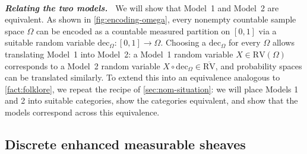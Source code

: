 \documentclass[
  sigconf,
  screen, ]{acmart}
\theoremstyle{definition}
\newcommand\goodparagraph[1]{\hspace{0em}\\[-0.5em]\textbf{\textit{#1.~}}}
\newcommand\nref[2]{\hyperref[#1]{#2}} \newcommand\checkhigh{{\huge{\color{red}\textbf{TODO: check}}}}
\newcommand\sheafcatadj{enhanced measurable}
\newcommand\Dgoodsheaves{Discrete \sheafcatadj{} sheaves}
\newcommand\dec{\mathrm{dec}}
\newcommand\nomDRVprelim{{\nref{def:nomDRVprelim}{\overline{\mathrm{RV}}}}}
\newcommand\DRV{{\nref{prop:dwarp-in-the-atomic-sheaves}{\mathrm{RV}}}}
\begin{document}
\goodparagraph{Relating the two models}
We will show that Model~1 and Model~2 are equivalent.
As shown in \ref{fig:encoding-omega},
every nonempty countable sample space $\Omega$ can be encoded as a
countable measured partition on $[0,1]$ via a suitable
random variable $\dec_\Omega : [0,1]\to\Omega$.
Choosing a $\dec_\Omega$
for every $\Omega$
allows translating Model~1 into Model~2:
a Model~1 random variable $X \in \DRV(\Omega)$
corresponds to a Model~2 random variable $X\circ\dec_\Omega\in\nomDRVprelim$,
and probability spaces can be translated similarly.
To extend this into an equivalence analogous to \cref{fact:folklore},
we repeat the recipe of \cref{sec:nom-situation}: we will
place Models 1 and 2 into suitable categories, show the categories equivalent, and
show that the models correspond across this equivalence.

\subsection{\Dgoodsheaves{}}
\end{document}
